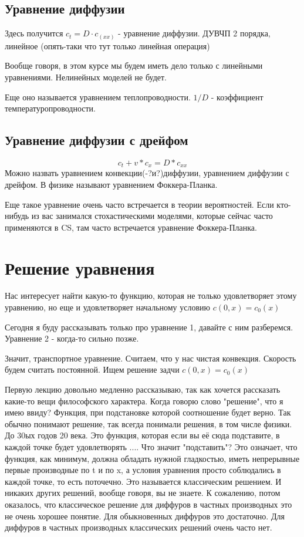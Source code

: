 \subsection*{Уравнение диффузии}
Здесь получится $c_t = D \cdot c_(xx)$ - уравнение диффузии. ДУВЧП 2 порядка, линейное (опять-таки что тут только линейная операция)

Вообще говоря, в этом курсе мы будем иметь дело только с линейными уравнениями. Нелинейных моделей не будет.

Еще оно называется уравнением теплопроводности. $1/D$ - коэффициент температуропроводности.

\subsection*{Уравнение диффузии с дрейфом}
$$c_t + v * c_x = D * c_{xx}$$
Можно назвать уравнением конвекции(-?и?)диффузии, уравнением диффузии с дрейфом. В физике называют уравнением Фоккера-Планка.

Еще такое уравнение очень часто встречается в теории вероятностей. Если кто-нибудь из вас занимался стохастическими моделями, которые сейчас часто применяются в CS, там часто встречается уравнение Фоккера-Планка.


\section{Решение уравнения}
Нас интересует найти какую-то функцию, которая не только удовлетворяет этому уравнению, но еще и удовлетворяет начальному условию $c(0, x) = c_0(x)$

Сегодня я буду рассказывать только про уравнение 1, давайте с ним разберемся. Уравнение 2 - когда-то сильно позже.

Значит, транспортное уравнение. Считаем, что у нас чистая конвекция. Скорость будем считать постоянной. Ищем решение задчи $c(0,x) = c_0(x)$

Первую лекцию довольно медленно рассказываю, так как хочется рассказать какие-то вещи философского характера. Когда говорю слово "решение", что я имею ввиду? Функция, при подстановке которой соотношение будет верно. Так обычно понимают решение, так всегда понимали решения, в том числе физики. До 30ых годов 20 века. Это функция, которая если вы её сюда подставите, в каждой точке будет удовлетворять ....
Что значит "подставить"? Это означает, что функция, как минимум, должна обладать нужной гладкостью, иметь непрерывные первые производные по t и по x, а условия уравнения просто соблюдались в каждой точке, то есть поточечно. Это называется классическим решением. И никаких других решений, вообще говоря, вы не знаете. К сожалению, потом оказалось, что классическое решение для диффуров в частных производных это не очень хорошее понятие. Для обыкновенных диффуров это достаточно. Для диффуров в частных производных классических решений очень часто нет.

